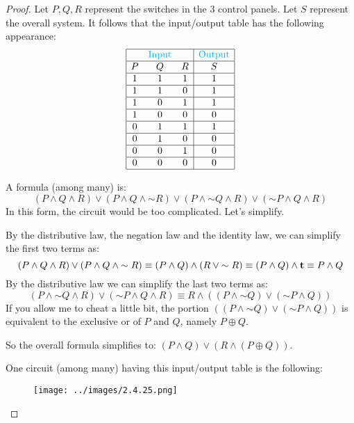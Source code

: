 \documentclass[14pt]{extarticle}
\newcommand{\true}{{\bf t}}
\begin{document}
\begin{proof}
    Let $P, Q, R$ represent the switches in the 3 control panels. Let $S$ represent the overall system. It follows that the input/output table has the following appearance:
    $$
        \begin{array}{|ccc|c|}
            \hline
              & \color{cyan}\text{Input} &   & \color{cyan}\text{Output} \\
            \hline
            P & Q                        & R & S                         \\
            \hline
            1 & 1                        & 1 & 1                         \\
            \hline
            1 & 1                        & 0 & 1                         \\
            \hline
            1 & 0                        & 1 & 1                         \\
            \hline
            1 & 0                        & 0 & 0                         \\
            \hline
            0 & 1                        & 1 & 1                         \\
            \hline
            0 & 1                        & 0 & 0                         \\
            \hline
            0 & 0                        & 1 & 0                         \\
            \hline
            0 & 0                        & 0 & 0                         \\
            \hline
        \end{array}
    $$

    A formula (among many) is:
    $$
        (P \wedge Q \wedge R) \vee (P \wedge Q \wedge {\sim R}) \vee (P \wedge {\sim Q} \wedge R) \vee ({\sim P} \wedge Q \wedge R)
    $$
    In this form, the circuit would be too complicated. Let's simplify.

    By the distributive law, the negation law and the identity law, we can simplify the first two terms as:
    $$
        (P \wedge Q \wedge R) \vee (P \wedge Q \wedge {\sim R}) \equiv (P \wedge Q) \wedge (R \vee {\sim R}) \equiv (P \wedge Q) \wedge
        \true \equiv P \wedge Q
    $$
    By the distributive law we can simplify the last two
    terms as:
    $$
        (P \wedge {\sim Q} \wedge R) \vee ({\sim P} \wedge Q \wedge R)
        \equiv R \wedge ((P \wedge {\sim Q}) \vee ({\sim P} \wedge Q))
    $$
    If you allow me to cheat a little bit, the portion $((P \wedge {\sim Q}) \vee ({\sim P} \wedge Q))$ is equivalent to the exclusive or of $P$ and $Q$, namely $P \oplus Q$.

    So the overall formula simplifies to: $(P \wedge Q) \vee (R \wedge (P \oplus Q))$.

    One circuit (among many) having this input/output table is the following:

    \begin{figure}[ht!]
        \centering
        \texttt{[image: ../images/2.4.25.png]}
    \end{figure}
\end{proof}
\end{document}
